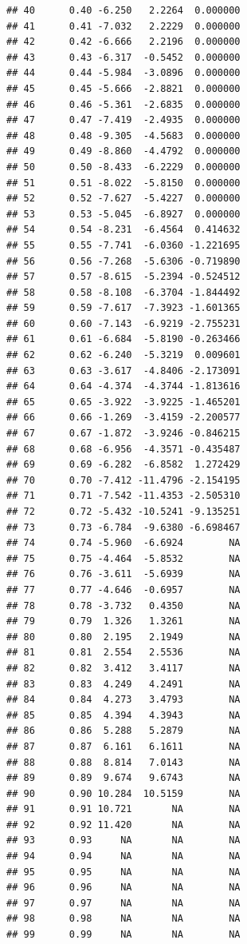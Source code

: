 \documentclass{article}\usepackage[]{graphicx}\usepackage[]{color}
\makeatletter
\newenvironment{kframe}{%
 \def\at@end@of@kframe{}%
 \ifinner\ifhmode%
  \def\at@end@of@kframe{\end{minipage}}%
  \begin{minipage}{\columnwidth}%
 \fi\fi%
 \def\FrameCommand##1{\hskip\@totalleftmargin \hskip-\fboxsep
 \colorbox{shadecolor}{##1}\hskip-\fboxsep
     \hskip-\linewidth \hskip-\@totalleftmargin \hskip\columnwidth}%
 \MakeFramed {\advance\hsize-\width
   \@totalleftmargin\z@ \linewidth\hsize
   \@setminipage}}%
 {\par\unskip\endMakeFramed%
 \at@end@of@kframe}
\newenvironment{knitrout}{}{} %
\makeatother
\begin{document}
\begin{knitrout}
\begin{kframe}
\begin{verbatim}
## 40      0.40 -6.250   2.2264  0.000000
## 41      0.41 -7.032   2.2229  0.000000
## 42      0.42 -6.666   2.2196  0.000000
## 43      0.43 -6.317  -0.5452  0.000000
## 44      0.44 -5.984  -3.0896  0.000000
## 45      0.45 -5.666  -2.8821  0.000000
## 46      0.46 -5.361  -2.6835  0.000000
## 47      0.47 -7.419  -2.4935  0.000000
## 48      0.48 -9.305  -4.5683  0.000000
## 49      0.49 -8.860  -4.4792  0.000000
## 50      0.50 -8.433  -6.2229  0.000000
## 51      0.51 -8.022  -5.8150  0.000000
## 52      0.52 -7.627  -5.4227  0.000000
## 53      0.53 -5.045  -6.8927  0.000000
## 54      0.54 -8.231  -6.4564  0.414632
## 55      0.55 -7.741  -6.0360 -1.221695
## 56      0.56 -7.268  -5.6306 -0.719890
## 57      0.57 -8.615  -5.2394 -0.524512
## 58      0.58 -8.108  -6.3704 -1.844492
## 59      0.59 -7.617  -7.3923 -1.601365
## 60      0.60 -7.143  -6.9219 -2.755231
## 61      0.61 -6.684  -5.8190 -0.263466
## 62      0.62 -6.240  -5.3219  0.009601
## 63      0.63 -3.617  -4.8406 -2.173091
## 64      0.64 -4.374  -4.3744 -1.813616
## 65      0.65 -3.922  -3.9225 -1.465201
## 66      0.66 -1.269  -3.4159 -2.200577
## 67      0.67 -1.872  -3.9246 -0.846215
## 68      0.68 -6.956  -4.3571 -0.435487
## 69      0.69 -6.282  -6.8582  1.272429
## 70      0.70 -7.412 -11.4796 -2.154195
## 71      0.71 -7.542 -11.4353 -2.505310
## 72      0.72 -5.432 -10.5241 -9.135251
## 73      0.73 -6.784  -9.6380 -6.698467
## 74      0.74 -5.960  -6.6924        NA
## 75      0.75 -4.464  -5.8532        NA
## 76      0.76 -3.611  -5.6939        NA
## 77      0.77 -4.646  -0.6957        NA
## 78      0.78 -3.732   0.4350        NA
## 79      0.79  1.326   1.3261        NA
## 80      0.80  2.195   2.1949        NA
## 81      0.81  2.554   2.5536        NA
## 82      0.82  3.412   3.4117        NA
## 83      0.83  4.249   4.2491        NA
## 84      0.84  4.273   3.4793        NA
## 85      0.85  4.394   4.3943        NA
## 86      0.86  5.288   5.2879        NA
## 87      0.87  6.161   6.1611        NA
## 88      0.88  8.814   7.0143        NA
## 89      0.89  9.674   9.6743        NA
## 90      0.90 10.284  10.5159        NA
## 91      0.91 10.721       NA        NA
## 92      0.92 11.420       NA        NA
## 93      0.93     NA       NA        NA
## 94      0.94     NA       NA        NA
## 95      0.95     NA       NA        NA
## 96      0.96     NA       NA        NA
## 97      0.97     NA       NA        NA
## 98      0.98     NA       NA        NA
## 99      0.99     NA       NA        NA
\end{verbatim}
\begin{alltt}

\end{alltt}
\end{kframe}
\end{knitrout}
\end{document}
